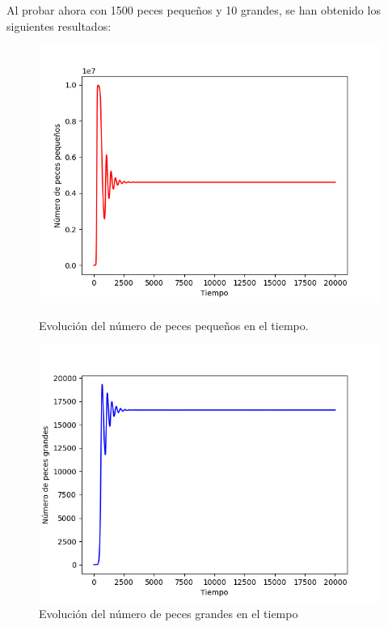 \documentclass[11pt,a4paper]{report}
\begin{document}
Al probar ahora con 1500 peces pequeños y 10 grandes, se han obtenido los siguientes resultados:

\begin{figure}[H]
\centering
\begin{minipage}{.5\textwidth}
  \centering
  \includegraphics[scale=0.4]{img/peces-1500-1.png}
  \caption{Evolución del número de peces pequeños en el tiempo.}
  \label{fig:peces-1500-p}
\end{minipage}%
\begin{minipage}{.5\textwidth}
  \centering
  \includegraphics[scale=0.4]{img/peces-1500-2.png}
  \caption{Evolución del número de peces grandes en el tiempo}
  \label{fig:peces-1500-g}
\end{minipage}
\end{figure}
\end{document}
